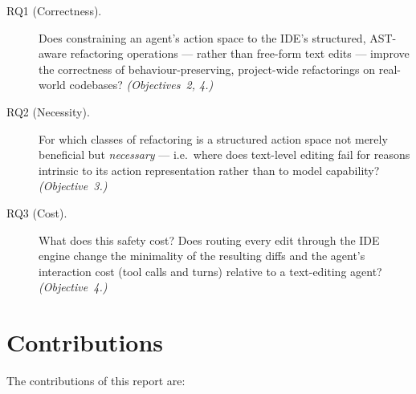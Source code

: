 \begin{description}
  \item[RQ1 (Correctness).] Does constraining an agent's action space to the
  IDE's structured, AST-aware refactoring operations --- rather than free-form
  text edits --- improve the correctness of behaviour-preserving, project-wide
  refactorings on real-world codebases? \emph{(Objectives~2, 4.)}

  \item[RQ2 (Necessity).] For which classes of refactoring is a structured
  action space not merely beneficial but \emph{necessary} --- i.e.\ where does
  text-level editing fail for reasons intrinsic to its action representation
  rather than to model capability? \emph{(Objective~3.)}

  \item[RQ3 (Cost).] What does this safety cost? Does routing every edit through
  the IDE engine change the minimality of the resulting diffs and the agent's
  interaction cost (tool calls and turns) relative to a text-editing agent?
  \emph{(Objective~4.)}
\end{description}

\section{Contributions}
\label{sec:intro-contributions}
The contributions of this report are:

